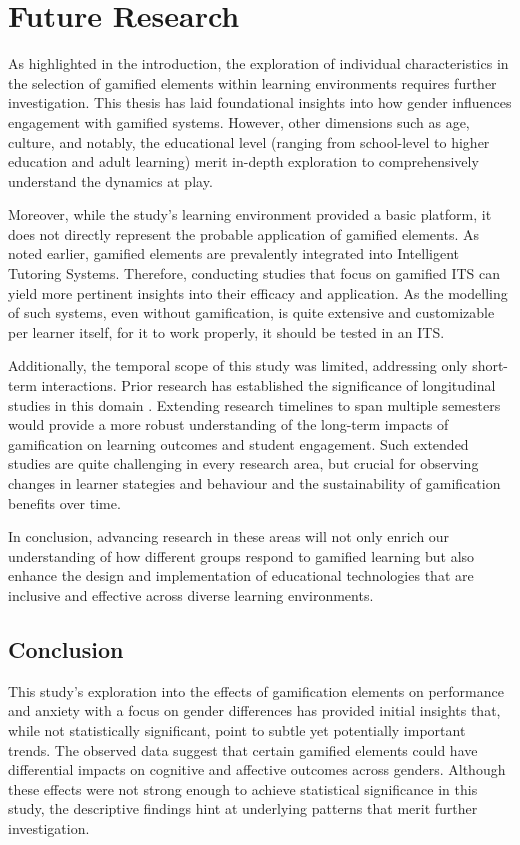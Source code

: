 \section{Future Research}
As highlighted in the introduction, the exploration of individual characteristics in the selection of gamified elements within learning environments requires further investigation. This thesis has laid foundational insights into how gender influences engagement with gamified systems. However, other dimensions such as age, culture, and notably, the educational level (ranging from school-level to higher education and adult learning) merit in-depth exploration to comprehensively understand the dynamics at play.

Moreover, while the study's learning environment provided a basic platform, it does not directly represent the probable application of gamified elements. As noted earlier, gamified elements are prevalently integrated into Intelligent Tutoring Systems. Therefore, conducting studies that focus on gamified ITS can yield more pertinent insights into their efficacy and application.
As the modelling of such systems, even without gamification, is quite extensive and customizable per learner itself, for it to work properly, it should be tested in an ITS.

Additionally, the temporal scope of this study was limited, addressing only short-term interactions. Prior research has established the significance of longitudinal studies in this domain \parencite{oliveiraTailoredGamificationEducation2023,dehghanzadehUsingGamificationSupport2024}. Extending research timelines to span multiple semesters would provide a more robust understanding of the long-term impacts of gamification on learning outcomes and student engagement. Such extended studies are quite challenging in every research area, but crucial for observing changes in learner stategies and behaviour and the sustainability of gamification benefits over time.

In conclusion, advancing research in these areas will not only enrich our understanding of how different groups respond to gamified learning but also enhance the design and implementation of educational technologies that are inclusive and effective across diverse learning environments.

\subsection*{Conclusion}
This study's exploration into the effects of gamification elements on performance and anxiety with a focus on gender differences has provided initial insights that, while not statistically significant, point to subtle yet potentially important trends.
The observed data suggest that certain gamified elements could have differential impacts on cognitive and affective outcomes across genders.
Although these effects were not strong enough to achieve statistical significance in this study, the descriptive findings hint at underlying patterns that merit further investigation.

